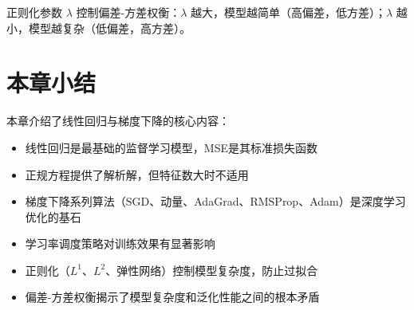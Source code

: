 正则化参数 $\lambda$ 控制偏差-方差权衡：$\lambda$ 越大，模型越简单（高偏差，低方差）；$\lambda$ 越小，模型越复杂（低偏差，高方差）。

\section{本章小结}

本章介绍了线性回归与梯度下降的核心内容：
\begin{itemize}
    \item 线性回归是最基础的监督学习模型，MSE是其标准损失函数
    \item 正规方程提供了解析解，但特征数大时不适用
    \item 梯度下降系列算法（SGD、动量、AdaGrad、RMSProp、Adam）是深度学习优化的基石
    \item 学习率调度策略对训练效果有显著影响
    \item 正则化（$L^1$、$L^2$、弹性网络）控制模型复杂度，防止过拟合
    \item 偏差-方差权衡揭示了模型复杂度和泛化性能之间的根本矛盾
\end{itemize}
